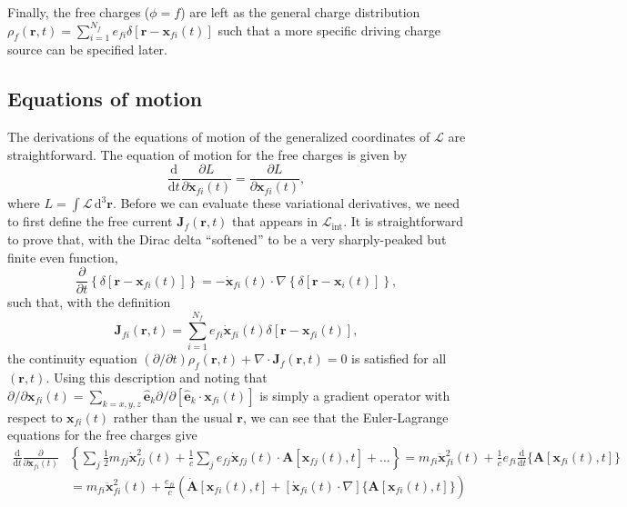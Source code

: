 \documentclass{article}
\begin{document}
Finally, the free charges ($\phi = f$) are left as the general charge distribution $\rho_f(\mathbf{r},t) = \sum_{i = 1}^{N_f}e_{fi}\delta[\mathbf{r} - \mathbf{x}_{fi}(t)]$ such that a more specific driving charge source can be specified later.











\subsection{Equations of motion}

The derivations of the equations of motion of the generalized coordinates of $\mathcal{L}$ are straightforward. The equation of motion for the free charges is given by
\begin{equation}
\frac{\mathrm{d}}{\mathrm{d}t}\frac{\partial L}{\partial \dot{\mathbf{x}}_{fi}(t)} = \frac{\partial L}{\partial \mathbf{x}_{fi}(t)},
\end{equation}
where $L = \int\mathcal{L}\,\mathrm{d}^3\mathbf{r}$. Before we can evaluate these variational derivatives, we need to first define the free current $\mathbf{J}_f(\mathbf{r},t)$ that appears in $\mathcal{L}_\mathrm{int}$. It is straightforward to prove that, with the Dirac delta ``softened'' to be a very sharply-peaked but finite even function,
\begin{equation}
\frac{\partial}{\partial t}\left\{\delta[\mathbf{r} - \mathbf{x}_{fi}(t)]\right\} = -\dot{\mathbf{x}}_{fi}(t)\cdot\nabla\left\{\delta[\mathbf{r} - \mathbf{x}_i(t)]\right\},
\end{equation}
such that, with the definition
\begin{equation}
\mathbf{J}_{fi}(\mathbf{r},t) = \sum_{i = 1}^{N_f}e_{fi}\dot{\mathbf{x}}_{fi}(t)\delta[\mathbf{r} - \mathbf{x}_{fi}(t)],
\end{equation}
the continuity equation $(\partial/\partial t)\rho_f(\mathbf{r},t) + \nabla\cdot\mathbf{J}_f(\mathbf{r},t) = 0$ is satisfied for all $(\mathbf{r},t)$. Using this description and noting that $\partial/\partial \mathbf{x}_{fi}(t) = \sum_{k = x,y,z}\hat{\mathbf{e}}_k\partial/\partial [\hat{\mathbf{e}}_k\cdot\mathbf{x}_{fi}(t)]$ is simply a gradient operator with respect to $\mathbf{x}_{fi}(t)$ rather than the usual $\mathbf{r}$, we can see that the Euler-Lagrange equations for the free charges give
\begin{equation}
\begin{split}
\frac{\mathrm{d}}{\mathrm{d}t}\frac{\partial}{\partial \dot{\mathbf{x}}_{fi}(t)}&\left\{\sum_j\frac{1}{2}m_{fj}\dot{\mathbf{x}}_{fj}^2(t) + \frac{1}{c}\sum_je_{fj}\dot{\mathbf{x}}_{fj}(t)\cdot\mathbf{A}[\mathbf{x}_{fj}(t),t] + \ldots\right\} = m_{fi}\ddot{\mathbf{x}}_{fi}^2(t) + \frac{1}{c}e_{fi}\frac{\mathrm{d}}{\mathrm{d}t}\{\mathbf{A}[\mathbf{x}_{fi}(t),t]\}\\
&= m_{fi}\ddot{\mathbf{x}}_{fi}^2(t) + \frac{e_{fi}}{c}\left(\dot{\mathbf{A}}[\mathbf{x}_{fi}(t),t] + \left[\dot{\mathbf{x}}_{fi}(t)\cdot\nabla\right]\{\mathbf{A}[\mathbf{x}_{fi}(t),t]\}\right)
\end{split}
\end{equation}
\end{document}
